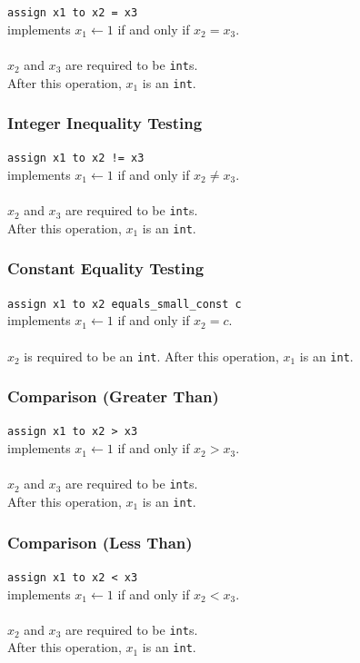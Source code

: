 \texttt{assign x1 to x2 = x3} \\
implements $x_1 \leftarrow 1$ if and only if $x_2 = x_3$. \\ \\
$x_2$ and $x_3$ are required to be \texttt{int}s. \\
After this operation, $x_1$ is an \texttt{int}.

\subsubsection{Integer Inequality Testing}

\texttt{assign x1 to x2 != x3} \\
implements $x_1 \leftarrow 1$ if and only if $x_2 \not= x_3$. \\ \\
$x_2$ and $x_3$ are required to be \texttt{int}s. \\
After this operation, $x_1$ is an \texttt{int}.

\subsubsection{Constant Equality Testing}

\texttt{assign x1 to x2 equals\_small\_const c} \\
implements $x_1 \leftarrow 1$ if and only if $x_2 = c$. \\ \\
$x_2$ is required to be an \texttt{int}.
After this operation, $x_1$ is an \texttt{int}.

\subsubsection{Comparison (Greater Than)}

\texttt{assign x1 to x2 > x3} \\
implements $x_1 \leftarrow 1$ if and only if $x_2 > x_3$. \\ \\
$x_2$ and $x_3$ are required to be \texttt{int}s. \\
After this operation, $x_1$ is an \texttt{int}.

\subsubsection{Comparison (Less Than)}

\texttt{assign x1 to x2 < x3} \\
implements $x_1 \leftarrow 1$ if and only if $x_2 < x_3$. \\ \\
$x_2$ and $x_3$ are required to be \texttt{int}s. \\
After this operation, $x_1$ is an \texttt{int}.

